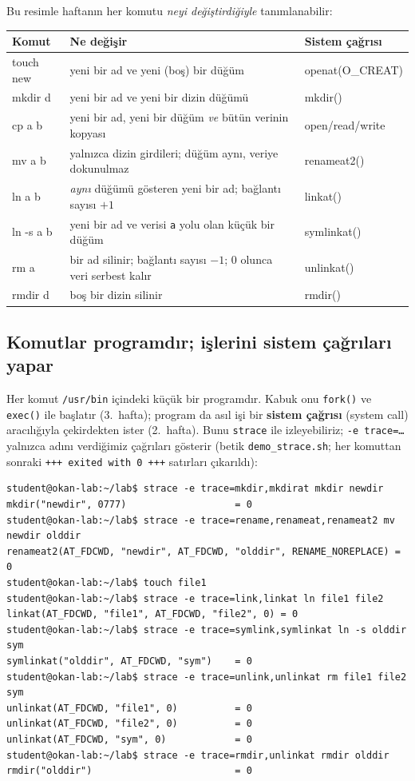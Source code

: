 \documentclass[11pt,a4paper]{article}
\newcommand{\term}[1]{\textbf{\color{mintdeep}#1}}
\newcommand{\cmd}[1]{\texttt{#1}}
\begin{document}
Bu resimle haftanın her komutu \emph{neyi değiştirdiğiyle} tanımlanabilir:

\begin{center}
\renewcommand{\arraystretch}{1.25}
\begin{tabularx}{\linewidth}{>{\ttfamily}l >{\raggedright\arraybackslash}X >{\ttfamily}l}
\toprule
\textrm{\textbf{Komut}} & \textbf{Ne değişir} & \textrm{\textbf{Sistem çağrısı}} \\
\midrule
touch new & yeni bir ad ve yeni (boş) bir düğüm & openat(O\_CREAT) \\
mkdir d & yeni bir ad ve yeni bir dizin düğümü & mkdir() \\
cp a b & yeni bir ad, yeni bir düğüm \emph{ve} bütün verinin kopyası & open/read/write \\
mv a b & yalnızca dizin girdileri; düğüm aynı, veriye dokunulmaz & renameat2() \\
ln a b & \emph{aynı} düğümü gösteren yeni bir ad; bağlantı sayısı $+1$ & linkat() \\
ln -s a b & yeni bir ad ve verisi \texttt{a} yolu olan küçük bir düğüm & symlinkat() \\
rm a & bir ad silinir; bağlantı sayısı $-1$; $0$ olunca veri serbest kalır & unlinkat() \\
rmdir d & boş bir dizin silinir & rmdir() \\
\bottomrule
\end{tabularx}
\end{center}

\subsection{Komutlar programdır; işlerini sistem çağrıları yapar}

Her komut \texttt{/usr/bin} içindeki küçük bir programdır. Kabuk onu \cmd{fork()} ve \cmd{exec()} ile başlatır (3.~hafta); program da asıl işi bir \term{sistem çağrısı} (system call) aracılığıyla çekirdekten ister (2.~hafta). Bunu \cmd{strace} ile izleyebiliriz; \cmd{-e trace=\dots} yalnızca adını verdiğimiz çağrıları gösterir (betik \cmd{demo\_strace.sh}; her komuttan sonraki \texttt{+++ exited with 0 +++} satırları çıkarıldı):

\begin{lstlisting}[style=term]
student@okan-lab:~/lab$ strace -e trace=mkdir,mkdirat mkdir newdir
mkdir("newdir", 0777)                   = 0
student@okan-lab:~/lab$ strace -e trace=rename,renameat,renameat2 mv newdir olddir
renameat2(AT_FDCWD, "newdir", AT_FDCWD, "olddir", RENAME_NOREPLACE) = 0
student@okan-lab:~/lab$ touch file1
student@okan-lab:~/lab$ strace -e trace=link,linkat ln file1 file2
linkat(AT_FDCWD, "file1", AT_FDCWD, "file2", 0) = 0
student@okan-lab:~/lab$ strace -e trace=symlink,symlinkat ln -s olddir sym
symlinkat("olddir", AT_FDCWD, "sym")    = 0
student@okan-lab:~/lab$ strace -e trace=unlink,unlinkat rm file1 file2 sym
unlinkat(AT_FDCWD, "file1", 0)          = 0
unlinkat(AT_FDCWD, "file2", 0)          = 0
unlinkat(AT_FDCWD, "sym", 0)            = 0
student@okan-lab:~/lab$ strace -e trace=rmdir,unlinkat rmdir olddir
rmdir("olddir")                         = 0
\end{lstlisting}
\end{document}
